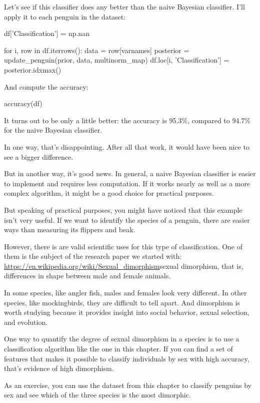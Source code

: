 \documentclass[12pt]{book}
\theoremstyle{exercise}
\begin{document}
Let's see if this classifier does any better than the naive Bayesian
classifier. I'll apply it to each penguin in the dataset:

\begin{code}
df['Classification'] = np.nan

for i, row in df.iterrows():
    data = row[varnames]
    posterior = update_penguin(prior, data, multinorm_map)
    df.loc[i, 'Classification'] = posterior.idxmax()
\end{code}

And compute the accuracy:

\begin{code}
accuracy(df)
\end{code}

It turns out to be only a little better: the accuracy is 95.3\%,
compared to 94.7\% for the naive Bayesian classifier.

In one way, that's disappointing. After all that work, it would have
been nice to see a bigger difference.

But in another way, it's good news. In general, a naive Bayesian
classifier is easier to implement and requires less computation. If it
works nearly as well as a more complex algorithm, it might be a good
choice for practical purposes.

But speaking of practical purposes, you might have noticed that this
example isn't very useful. If we want to identify the species of a
penguin, there are easier ways than measuring its flippers and beak.

However, there is are valid scientific uses for this type of
classification. One of them is the subject of the research paper we
started with:
\url{https://en.wikipedia.org/wiki/Sexual_dimorphism}{sexual
dimorphism}, that is, differences in shape between male and female
animals.

In some species, like angler fish, males and females look very
different. In other species, like mockingbirds, they are difficult to
tell apart. And dimorphism is worth studying because it provides insight
into social behavior, sexual selection, and evolution.

One way to quantify the degree of sexual dimorphism in a species is to
use a classification algorithm like the one in this chapter. If you can
find a set of features that makes it possible to classify individuals by
sex with high accuracy, that's evidence of high dimorphism.

As an exercise, you can use the dataset from this chapter to classify
penguins by sex and see which of the three species is the most
dimorphic.
\end{document}
